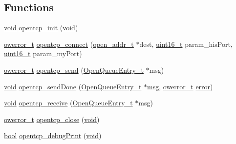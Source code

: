 \subsection*{Functions}
\begin{DoxyCompactItemize}
\item 
\hyperlink{usb__devapi_8h_afabf60e7f57651d6d595a02c75f07cd0}{void} \hyperlink{group___open_tcp_ga630ea088dd5586fa2bf2549e0a19cd01}{opentcp\+\_\+init} (\hyperlink{usb__devapi_8h_afabf60e7f57651d6d595a02c75f07cd0}{void})
\item 
\hyperlink{opendefs_8h_af20b7c3ed9d2ba19e56a309ad9314803}{owerror\+\_\+t} \hyperlink{group___open_tcp_gacae8f1bb011242c25d7265b0a29086e0}{opentcp\+\_\+connect} (\hyperlink{structopen__addr__t}{open\+\_\+addr\+\_\+t} $\ast$dest, \hyperlink{_p_e___types_8h_a1f1825b69244eb3ad2c7165ddc99c956}{uint16\+\_\+t} param\+\_\+his\+Port, \hyperlink{_p_e___types_8h_a1f1825b69244eb3ad2c7165ddc99c956}{uint16\+\_\+t} param\+\_\+my\+Port)
\item 
\hyperlink{opendefs_8h_af20b7c3ed9d2ba19e56a309ad9314803}{owerror\+\_\+t} \hyperlink{group___open_tcp_ga805491d0b5f5370b4519f4a517ce8ecd}{opentcp\+\_\+send} (\hyperlink{struct_open_queue_entry__t}{Open\+Queue\+Entry\+\_\+t} $\ast$msg)
\item 
\hyperlink{usb__devapi_8h_afabf60e7f57651d6d595a02c75f07cd0}{void} \hyperlink{group___open_tcp_ga67fc33f904edb23ef9954ee7ef017ed4}{opentcp\+\_\+send\+Done} (\hyperlink{struct_open_queue_entry__t}{Open\+Queue\+Entry\+\_\+t} $\ast$msg, \hyperlink{opendefs_8h_af20b7c3ed9d2ba19e56a309ad9314803}{owerror\+\_\+t} \hyperlink{disk_8c_ad018a3100b2dabad325a0800152db297}{error})
\item 
\hyperlink{usb__devapi_8h_afabf60e7f57651d6d595a02c75f07cd0}{void} \hyperlink{group___open_tcp_ga44ab3490367a5b44b9c122b8231767b7}{opentcp\+\_\+receive} (\hyperlink{struct_open_queue_entry__t}{Open\+Queue\+Entry\+\_\+t} $\ast$msg)
\item 
\hyperlink{opendefs_8h_af20b7c3ed9d2ba19e56a309ad9314803}{owerror\+\_\+t} \hyperlink{group___open_tcp_ga9fb6788df0f471a3668acc68bd6daa4f}{opentcp\+\_\+close} (\hyperlink{usb__devapi_8h_afabf60e7f57651d6d595a02c75f07cd0}{void})
\item 
\hyperlink{_p_e___types_8h_a97a80ca1602ebf2303258971a2c938e2}{bool} \hyperlink{group___open_tcp_ga25394a02c506d271bbcbadad69819da9}{opentcp\+\_\+debug\+Print} (\hyperlink{usb__devapi_8h_afabf60e7f57651d6d595a02c75f07cd0}{void})
\end{DoxyCompactItemize}


